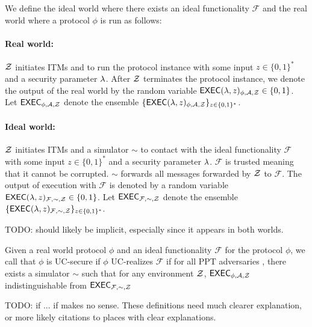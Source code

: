 We define the ideal world where there exists an ideal functionality $ \mathcal{F} $ and the real world where a protocol $ \phi $ is run as follows:

\paragraph{Real world:} $ \mathcal{Z} $ initiates ITMs and \adv to run the protocol instance with some input $ z \in \{0,1\}^* $  and a security parameter $ \lambda $. After $ \mathcal{Z} $ terminates the protocol instance, we denote the output of the real world by the random variable $ \mathsf{EXEC}(\lambda, z)_{\phi, \mathcal{A}, \mathcal{Z}} \in \{0,1\} $. Let $ \mathsf{EXEC}_{\phi, \mathcal{A}, \mathcal{Z}} $ denote the ensemble $ \{\mathsf{EXEC}(\lambda, z)_{\phi, \mathcal{A}, \mathcal{Z}} \}_{z \in \{0,1\}^*} $.

\paragraph{Ideal world:} $ \mathcal{Z} $ initiates ITMs and a simulator $ \sim $ to contact with the ideal functionality $ \mathcal{F} $ with some input $ z \in \{0,1\}^* $  and a security parameter $ \lambda $. $ \mathcal{F} $ is trusted meaning that it cannot be corrupted.
$ \sim $ forwards all messages forwarded by $ \mathcal{Z} $ to $ \mathcal{F} $. The output of execution with $ \mathcal{F} $ is denoted by a random variable $ \mathsf{EXEC}(\lambda, z)_{\mathcal{F},\sim, \mathcal{Z}} \in \{0,1\}$.  Let $ \mathsf{EXEC}_{\mathcal{F},\sim, \mathcal{Z}} $ denote the ensemble $ \{\mathsf{EXEC}(\lambda, z)_{\mathcal{F}, \sim, \mathcal{Z}} \}_{z \in \{0,1\}^*} $.

TODO: \secparam should likely be implicit, especially since it appears in both worlds.

\begin{definition} \label{def:uc}
Given a real world protocol $ \phi $ and an ideal functionality $ \mathcal{F} $ for the protocol $ \phi $, we call that $ \phi $ is UC-secure if $ \phi $ UC-realizes $ \mathcal{F} $ if for all PPT adversaries \adv, there exists a simulator $ \sim  $ such that for any environment $ \mathcal{Z} $,
 $\mathsf{EXEC}_{\phi, \mathcal{A}, \mathcal{Z}}$ indistinguishable from $\mathsf{EXEC}_{\mathcal{F},\sim, \mathcal{Z}}$
\end{definition}

TODO: if ... if makes no sense.  These definitions need much clearer explanation, or more likely citations to places with clear explanations. 

